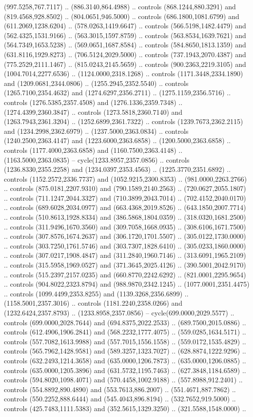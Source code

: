 (997.5258,767.7117) .. (886.3140,864.4988) .. controls (868.1244,880.3291) and (819.4568,928.8502) .. (804.0651,946.5000) .. controls (686.1800,1081.6799) and (611.2069,1238.6204) .. (578.0263,1419.6647) .. controls (566.5198,1482.4479) and (562.4325,1531.9166) .. (563.3015,1597.8759) .. controls (563.8534,1639.7621) and (564.7349,1653.5238) .. (569.0651,1687.8584) .. controls (584.8650,1813.1359) and (631.8116,1929.8273) .. (706.5124,2029.5000) .. controls (737.1943,2070.4387) and (775.2529,2111.1467) .. (815.0243,2145.5659) .. controls (900.2363,2219.3105) and (1004.7014,2277.6536) .. (1124.0000,2318.1268) .. controls (1171.3448,2334.1890) and (1209.0681,2344.0806) .. (1255.2945,2352.5540) .. controls (1265.7100,2354.4632) and (1274.6297,2356.2711) .. (1275.1159,2356.5716) .. controls (1276.5385,2357.4508) and (1276.1336,2359.7348) .. (1274.4399,2360.3847) .. controls (1273.5818,2360.7140) and (1263.7943,2361.3204) .. (1252.6899,2361.7322) .. controls (1239.7673,2362.2115) and (1234.2998,2362.6979) .. (1237.5000,2363.0834) .. controls (1240.2500,2363.4147) and (1223.6000,2363.6858) .. (1200.5000,2363.6858) .. controls (1177.4000,2363.6858) and (1160.7500,2363.4148) .. (1163.5000,2363.0835) -- cycle(1233.8957,2357.0856) .. controls (1236.8330,2355.2258) and (1234.0397,2353.4563) .. (1225.3770,2351.6892) .. controls (1152.2572,2336.7737) and (1052.9215,2300.8353) .. (981.0000,2263.2766) .. controls (875.0181,2207.9310) and (790.1589,2140.2563) .. (720.0627,2055.1807) .. controls (711.1247,2044.3327) and (710.3899,2043.7014) .. (702.4152,2040.0170) .. controls (689.6028,2034.0977) and (663.4368,2019.8526) .. (643.1850,2007.7714) .. controls (510.8613,1928.8334) and (386.5868,1804.0359) .. (318.0320,1681.2500) .. controls (311.9496,1670.3560) and (309.7058,1668.0935) .. (308.6106,1671.7500) .. controls (307.8576,1674.2637) and (306.1720,1701.5507) .. (305.0122,1730.0000) .. controls (303.7250,1761.5746) and (303.7307,1828.6410) .. (305.0233,1860.0000) .. controls (307.0217,1908.4847) and (311.2840,1960.7146) .. (313.6091,1965.2109) .. controls (315.5958,1969.0527) and (371.3645,2025.4126) .. (390.5001,2042.9170) .. controls (515.2397,2157.0235) and (660.8770,2242.6292) .. (821.0001,2295.9654) .. controls (904.8022,2323.8794) and (988.9870,2342.1245) .. (1077.0001,2351.4475) .. controls (1099.4499,2353.8255) and (1139.3268,2356.6899) .. (1158.5001,2357.3016) .. controls (1181.2240,2358.0266) and (1232.6424,2357.8793) .. (1233.8958,2357.0856) -- cycle(699.0000,2029.5577) .. controls (699.0000,2028.7644) and (694.8375,2022.2533) .. (689.7500,2015.0886) .. controls (612.4906,1906.2841) and (568.2232,1777.4075) .. (559.0285,1634.5171) .. controls (557.7082,1613.9988) and (557.7015,1556.1558) .. (559.0172,1535.4829) .. controls (565.7962,1428.9581) and (589.3257,1323.7027) .. (628.8874,1222.9296) .. controls (632.2493,1214.3658) and (635.0000,1206.7873) .. (635.0000,1206.0885) .. controls (635.0000,1205.3896) and (631.5732,1195.7463) .. (627.3848,1184.6589) .. controls (594.8020,1098.4071) and (570.4458,1002.9188) .. (557.8988,912.2401) .. controls (554.8892,890.4890) and (553.7613,886.2007) .. (551.4671,887.7862) .. controls (550.2252,888.6444) and (545.4043,896.8194) .. (532.7652,919.5000) .. controls (425.7483,1111.5383) and (352.5615,1329.3250) .. (321.5588,1548.0000) .. 